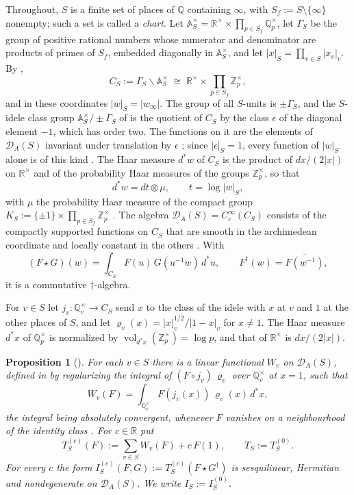 \documentclass[11pt]{amsart}
\newtheorem{proposition}[theorem]{Proposition}
\theoremstyle{remark}
\numberwithin{equation}{section}
\newcommand{\R}{\mathbb R}
\newcommand{\Z}{\mathbb Z}
\newcommand{\Q}{\mathbb Q}
\newcommand{\A}{\mathbb A}
\newcommand{\vol}{\operatorname{vol}}
\newcommand{\DA}{\mathcal D_A}
\newcommand{\CS}{C_S}
\begin{document}
Throughout, $S$ is a finite set of places of $\Q$ containing $\infty$, with
$S_f:=S\setminus\{\infty\}$ nonempty; such a set is called a \emph{chart}.
Let $\A_S^\times=\R^\times\times\prod_{p\in S_f}\Q_p^\times$, let $\Gamma_S$ be
the group of positive rational numbers whose numerator and denominator are
products of primes of $S_f$, embedded diagonally in $\A_S^\times$, and let
$|x|_S=\prod_{v\in S}|x_v|_v$.  By \cite[Lemma~2.3]{P43},
\[
  \CS:=\Gamma_S\backslash\A_S^\times\;\cong\;
  \R^\times\times\prod_{p\in S_f}\Z_p^\times ,
\]
and in these coordinates $|w|_S=|w_\infty|$.  The group of all $S$-units is
$\pm\Gamma_S$, and the $S$-idele class group $\A_S^\times/\pm\Gamma_S$ of
\cite{Connes99,MeyerIdele} is the quotient of $\CS$ by the class $\epsilon$
of the diagonal element $-1$, which has order two.  The functions on it are
the elements of $\DA(S)$ invariant under translation by $\epsilon$
\cite[Lemma~2.5]{P43}; since $|\epsilon|_S=1$, every function of $|w|_S$
alone is of this kind \cite[Remark~6.19(iii)]{P43}.  The Haar measure $d^*w$ of $\CS$
is the product of $dx/(2|x|)$ on $\R^\times$ and of the probability Haar
measures of the groups $\Z_p^\times$, so that
\begin{equation}
\label{eq:disint}
  d^*w=dt\otimes\mu,\qquad t=\log|w|_S ,
\end{equation}
with $\mu$ the probability Haar measure of the compact group
$K_S:=\{\pm1\}\times\prod_{p\in S_f}\Z_p^\times$
\cite[(9) and the lines following]{P43}.  The algebra
$\DA(S)=C_c^\infty(\CS)$ consists of the compactly supported functions on
$\CS$ that are smooth in the archimedean coordinate and locally constant in
the others \cite[Definition~2.4]{P43}.  With
\[
  (F\star G)(w)=\int_{\CS}F(u)\,G(u^{-1}w)\,d^*u,\qquad
  F^\dagger(w)=\overline{F(w^{-1})},
\]
it is a commutative $\dagger$-algebra.

For $v\in S$ let $j_v\colon\Q_v^\times\to\CS$ send $x$ to the class of the
idele with $x$ at $v$ and $1$ at the other places of $S$, and let
$\varrho_v(x)=|x|_v^{1/2}/|1-x|_v$ for $x\ne1$.  The Haar measure $d^*x$ of
$\Q_p^\times$ is normalized by $\vol_{d^*x}(\Z_p^\times)=\log p$, and that of
$\R^\times$ is $dx/(2|x|)$.

\begin{proposition}[{\cite[Definition~5.4, Convention~5.5, Theorem~5.6,
Proposition~6.3, Theorem~6.5]{P43}}]
\label{prop:trace}
For each $v\in S$ there is a linear functional $W_v$ on $\DA(S)$, defined in
\cite[Definition~5.4]{P43} by regularizing the integral of
$(F\circ j_v)\,\varrho_v$ over $\Q_v^\times$ at $x=1$, such that
\[
  W_v(F)=\int_{\Q_v^\times}F(j_v(x))\,\varrho_v(x)\,d^*x ,
\]
the integral being absolutely convergent, whenever $F$ vanishes on a
neighbourhood of the identity class \cite[(33) and the proof of
Theorem~5.6]{P43}.  For $c\in\R$ put
\begin{equation}
\label{eq:tracec}
  T^{(c)}_S(F):=\sum_{v\in S}W_v(F)+c\,F(1),\qquad T_S:=T^{(0)}_S .
\end{equation}
For every $c$ the form $I^{(c)}_S(F,G):=T^{(c)}_S(F\star G^\dagger)$ is
sesquilinear, Hermitian and nondegenerate on $\DA(S)$.  We write
$I_S:=I^{(0)}_S$.
\end{proposition}
\end{document}
